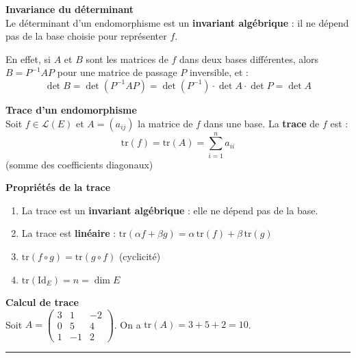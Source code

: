 \documentclass[../PolyS4.tex]{subfiles}
\begin{document}
\begin{Prop}\textbf{Invariance du déterminant}\\

Le déterminant d'un endomorphisme est un \textbf{invariant algébrique} : il ne dépend pas de la base choisie pour représenter $f$.

En effet, si $A$ et $B$ sont les matrices de $f$ dans deux bases différentes, alors $B = P^{-1}AP$ pour une matrice de passage $P$ inversible, et :
$$\det B = \det(P^{-1}AP) = \det(P^{-1}) \cdot \det A \cdot \det P = \det A$$
\end{Prop}

\begin{Def}\textbf{Trace d'un endomorphisme}\\

Soit $f \in \mathcal{L}(E)$ et $A = (a_{ij})$ la matrice de $f$ dans une base. La \textbf{trace} de $f$ est :
$$\text{tr}(f) = \text{tr}(A) = \sum_{i=1}^{n} a_{ii}$$
(somme des coefficients diagonaux)
\end{Def}

\begin{Prop}\textbf{Propriétés de la trace}\\

\begin{enumerate}
    \item La trace est un \textbf{invariant algébrique} : elle ne dépend pas de la base.
    \item La trace est \textbf{linéaire} : $\text{tr}(\alpha f + \beta g) = \alpha \, \text{tr}(f) + \beta \, \text{tr}(g)$
    \item $\text{tr}(f \circ g) = \text{tr}(g \circ f)$ (cyclicité)
    \item $\text{tr}(\text{Id}_E) = n = \dim E$
\end{enumerate}
\end{Prop}

\begin{Ex}\textbf{Calcul de trace}\\

Soit $A = \begin{pmatrix} 3 & 1 & -2 \\ 0 & 5 & 4 \\ 1 & -1 & 2 \end{pmatrix}$. On a $\text{tr}(A) = 3 + 5 + 2 = 10$.
\end{Ex}

\vspace{1em}
\hrule
\vspace{1em}
\end{document}

